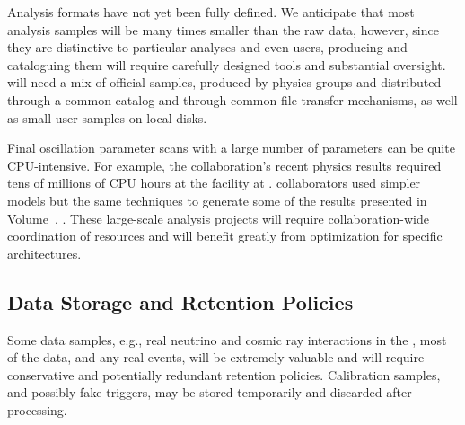 Analysis formats have not yet been fully defined.  We anticipate that most analysis samples will be many times smaller than the raw data, however, since they are %
distinctive to particular analyses and even users,  producing and cataloguing them will require carefully designed tools and substantial oversight. 
 will need a mix of official samples, produced by physics groups and distributed through a common catalog and through common file transfer mechanisms, as well as small user samples on local disks. 

Final oscillation parameter scans with a large number of %
parameters can be quite CPU-intensive.  For example, the  collaboration's recent physics results required tens of millions of  CPU hours at the  %
facility at .  collaborators used simpler models but the same techniques to generate some of the results presented in Volume~\volnumberphysics{}, \voltitlephysics{}. These large-scale analysis projects will require collaboration-wide coordination of resources and will benefit greatly from optimization for specific architectures.

\subsection{Data Storage and Retention Policies}
\label{sec:exec-comp-dsrp}

Some data samples, e.g., real neutrino and cosmic ray interactions in the , most of the  data, and any real  events, will be extremely valuable and will require conservative and potentially redundant retention policies.    Calibration samples, and possibly fake  triggers, may be stored temporarily and discarded after processing. 

